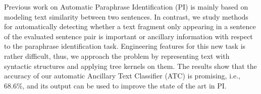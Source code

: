 Previous work on Automatic Paraphrase Identification (PI) is mainly based on modeling text similarity between two sentences. In contrast,  we study methods for automatically detecting whether a text fragment only appearing in a sentence of the evaluated sentence pair is important or ancillary information with respect to the paraphrase identification task. Engineering features for this new task is rather difficult, thus, we approach the problem by representing text with syntactic structures and applying tree kernels on them. The results show that the accuracy of our automatic Ancillary Text Classifier (ATC) is promising, i.e., 68.6\%, and its output can be used to improve the state of the art in PI.
